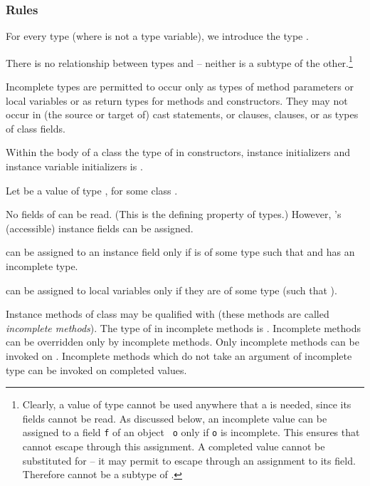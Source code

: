 \subsubsection{ Rules}
\label{protorules}
\label{ProtoRules}

For every type  (where  is not a type variable), we
introduce the type . 

There is no relationship between types  and  --
neither is a subtype of the other.\footnote{Clearly, a value of type
   cannot be used anywhere that a  is needed,
  since its fields cannot be read.  As discussed below, an incomplete
  value  can be assigned to a field {\tt f} of an object {\tt
    o} only if {\tt o} is incomplete. This ensures that  cannot
  escape through this assignment. A completed value  cannot be
  substituted for  -- it may permit  to escape through
  an assignment to its field. Therefore  cannot be a subtype of
  .}

Incomplete types are permitted to occur only as types of method
parameters or local variables or as return types for methods and
constructors. They may not occur in (the source or target of) cast
statements,  or  clauses, 
clauses, or as types of class fields.

Within the body of a class  the type of  in
constructors, instance initializers and instance variable initializers
is .

Let  be a value of type , for some class . 

No fields of  can be read.  (This is the defining property of
 types.)  However, 's (accessible) instance fields
can be assigned.

 can be assigned to an instance field  only if 
is of some type  such that  and  has an
incomplete type.

 can be assigned to local variables  only if they are of some type
 (such that ).

Instance methods of class  may be qualified with 
(these methods are called {\em incomplete methods}). The type of 
in incomplete methods is . Incomplete methods can be
overridden only by incomplete methods.  Only incomplete methods can be
invoked on . Incomplete methods which do not take an argument of incomplete
type can be invoked on completed values. 


